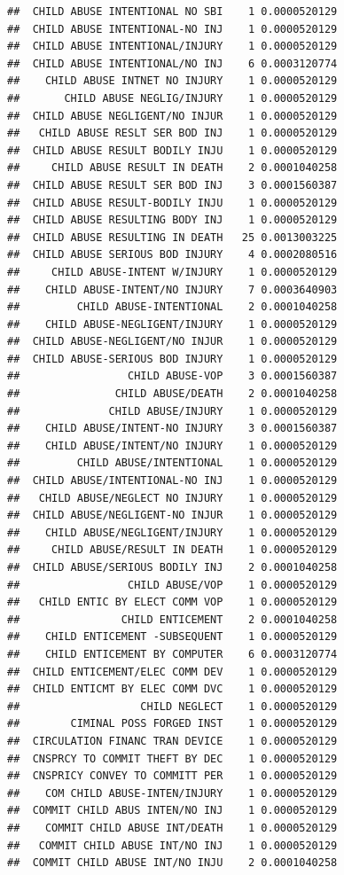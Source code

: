 \documentclass[]{book}
\begin{document}
\begin{verbatim}
##  CHILD ABUSE INTENTIONAL NO SBI    1 0.0000520129
##  CHILD ABUSE INTENTIONAL-NO INJ    1 0.0000520129
##  CHILD ABUSE INTENTIONAL/INJURY    1 0.0000520129
##  CHILD ABUSE INTENTIONAL/NO INJ    6 0.0003120774
##    CHILD ABUSE INTNET NO INJURY    1 0.0000520129
##       CHILD ABUSE NEGLIG/INJURY    1 0.0000520129
##  CHILD ABUSE NEGLIGENT/NO INJUR    1 0.0000520129
##   CHILD ABUSE RESLT SER BOD INJ    1 0.0000520129
##  CHILD ABUSE RESULT BODILY INJU    1 0.0000520129
##     CHILD ABUSE RESULT IN DEATH    2 0.0001040258
##  CHILD ABUSE RESULT SER BOD INJ    3 0.0001560387
##  CHILD ABUSE RESULT-BODILY INJU    1 0.0000520129
##  CHILD ABUSE RESULTING BODY INJ    1 0.0000520129
##  CHILD ABUSE RESULTING IN DEATH   25 0.0013003225
##  CHILD ABUSE SERIOUS BOD INJURY    4 0.0002080516
##     CHILD ABUSE-INTENT W/INJURY    1 0.0000520129
##    CHILD ABUSE-INTENT/NO INJURY    7 0.0003640903
##         CHILD ABUSE-INTENTIONAL    2 0.0001040258
##    CHILD ABUSE-NEGLIGENT/INJURY    1 0.0000520129
##  CHILD ABUSE-NEGLIGENT/NO INJUR    1 0.0000520129
##  CHILD ABUSE-SERIOUS BOD INJURY    1 0.0000520129
##                 CHILD ABUSE-VOP    3 0.0001560387
##               CHILD ABUSE/DEATH    2 0.0001040258
##              CHILD ABUSE/INJURY    1 0.0000520129
##    CHILD ABUSE/INTENT-NO INJURY    3 0.0001560387
##    CHILD ABUSE/INTENT/NO INJURY    1 0.0000520129
##         CHILD ABUSE/INTENTIONAL    1 0.0000520129
##  CHILD ABUSE/INTENTIONAL-NO INJ    1 0.0000520129
##   CHILD ABUSE/NEGLECT NO INJURY    1 0.0000520129
##  CHILD ABUSE/NEGLIGENT-NO INJUR    1 0.0000520129
##    CHILD ABUSE/NEGLIGENT/INJURY    1 0.0000520129
##     CHILD ABUSE/RESULT IN DEATH    1 0.0000520129
##  CHILD ABUSE/SERIOUS BODILY INJ    2 0.0001040258
##                 CHILD ABUSE/VOP    1 0.0000520129
##   CHILD ENTIC BY ELECT COMM VOP    1 0.0000520129
##                CHILD ENTICEMENT    2 0.0001040258
##    CHILD ENTICEMENT -SUBSEQUENT    1 0.0000520129
##    CHILD ENTICEMENT BY COMPUTER    6 0.0003120774
##  CHILD ENTICEMENT/ELEC COMM DEV    1 0.0000520129
##  CHILD ENTICMT BY ELEC COMM DVC    1 0.0000520129
##                   CHILD NEGLECT    1 0.0000520129
##        CIMINAL POSS FORGED INST    1 0.0000520129
##  CIRCULATION FINANC TRAN DEVICE    1 0.0000520129
##  CNSPRCY TO COMMIT THEFT BY DEC    1 0.0000520129
##  CNSPRICY CONVEY TO COMMITT PER    1 0.0000520129
##    COM CHILD ABUSE-INTEN/INJURY    1 0.0000520129
##  COMMIT CHILD ABUS INTEN/NO INJ    1 0.0000520129
##    COMMIT CHILD ABUSE INT/DEATH    1 0.0000520129
##   COMMIT CHILD ABUSE INT/NO INJ    1 0.0000520129
##  COMMIT CHILD ABUSE INT/NO INJU    2 0.0001040258

\end{verbatim}
\end{document}
